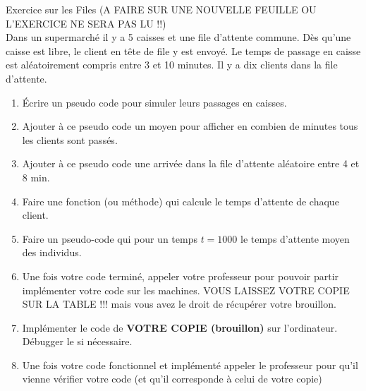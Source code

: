 \documentclass[12pt,fleqn]{report} %
\begin{document}
\begin{exercise}
Exercice sur les Files (A FAIRE SUR UNE NOUVELLE FEUILLE OU L'EXERCICE NE SERA PAS LU !!) \\
	Dans un supermarché il y a 5 caisses et une file d’attente commune. Dès qu’une caisse est libre, le client en tête de file y est
envoyé. Le temps de passage en caisse est aléatoirement compris entre 3 et 10 minutes. Il y a dix clients dans la file d’attente.
\begin{enumerate}
	\item \'Ecrire un pseudo code pour simuler leurs passages en caisses. 
	\item Ajouter à ce pseudo code un moyen pour afficher en combien de minutes tous les clients sont passés.
	\item Ajouter à ce pseudo code une arrivée dans la file d'attente aléatoire entre 4 et 8 min.
	\item Faire une fonction (ou méthode) qui calcule le temps d'attente de chaque client.
	\item Faire un pseudo-code qui pour un temps $t = 1000$ le temps d'attente moyen des individus.
	\item Une fois votre code terminé, appeler votre professeur pour pouvoir partir implémenter votre code sur les machines. VOUS LAISSEZ VOTRE COPIE SUR LA TABLE !!! mais vous avez le droit de récupérer votre brouillon.
	\item Implémenter le code de \textbf{VOTRE COPIE (brouillon)} sur l'ordinateur. Débugger le si nécessaire.
	\item Une fois votre code fonctionnel et implémenté appeler le professeur pour qu'il vienne vérifier votre code (et qu'il corresponde à celui de votre copie)
	
\end{enumerate} 
\end{exercise}
\end{document}
